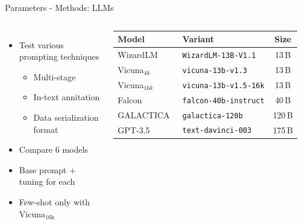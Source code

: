 \documentclass[en,16:9,smallfoot]{sdqbeamer}
\begin{document}
   \begin{frame}{Parameters - Methods: LLMs}
   \begin{columns}
           \begin{itemize}
               \item Test various prompting techniques
               \begin{itemize}
                   \item Multi-stage
                   \item In-text annitation
                   \item Data serialization format \checkmark
               \end{itemize}
               \item Compare 6 models
               \item Base prompt + tuning for each
               \item Few-shot only with Vicuna${}_\text{16k}$
           \end{itemize}
        \begin{table}
        \centering
          \begin{tabular}{llc}
            \hline
            Model & Variant & Size \\
            \hline
            WizardLM~\cite{xu2023wizardlm2023}
            & \texttt{WizardLM-13B-V1.1} & 13\,B \\
            Vicuna${}_{4k}$~\cite{vicuna2023}
            & \texttt{vicuna-13b-v1.3} & 13\,B \\
            Vicuna${}_{16k}$~\cite{vicuna2023}
            & \texttt{vicuna-13b-v1.5-16k} & 13\,B \\
            Falcon~\cite{falcon40b-huggingface}
            & \texttt{falcon-40b-instruct} & 40\,B \\
            GALACTICA~\cite{GALACTICA2022}
            & \texttt{galactica-120b} & 120\,B \\
            GPT-3.5~\cite{Brown2020gpt3}
            & \texttt{text-davinci-003} & 175\,B \\
            \hline
            \end{tabular}
        \end{table}
   \end{columns}
   \end{frame}
\end{document}
